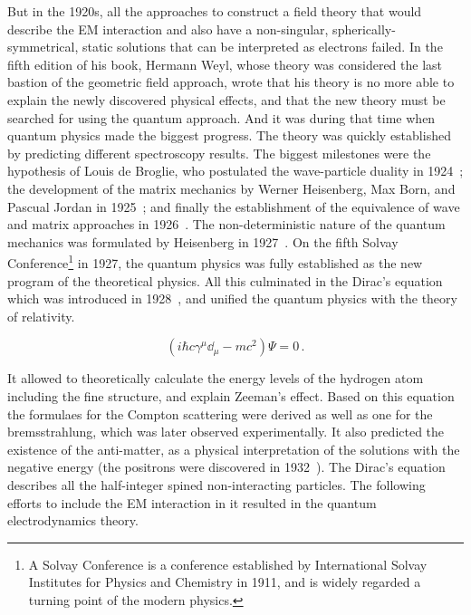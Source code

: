 But in the 1920s, all the approaches to construct a field theory that would describe the EM interaction and also have a non-singular, spherically-symmetrical, static solutions that can be interpreted as electrons failed. In the fifth edition of his book, Hermann Weyl, whose theory was considered the last bastion of the geometric field approach, wrote that his theory is  no more able to explain the newly discovered physical effects, and that the new theory must be searched for using the quantum approach. And it was during that time when quantum physics made the biggest progress. The theory was quickly established by predicting different spectroscopy results. The biggest milestones were the hypothesis of Louis de Broglie, who postulated the wave-particle duality in 1924~\cite{lib:theory_debroglie}; the development of the matrix mechanics by Werner Heisenberg, Max Born, and Pascual Jordan in 1925~\cite{lib:theory_quant1, lib:theory_quant2, lib:theory_quant3}; and finally the establishment of the equivalence of wave and matrix approaches in 1926~\cite{lib:theory_quant4}. The non-deterministic nature of the quantum mechanics was formulated by Heisenberg in 1927~\cite{lib:theory_quant5}. On the fifth Solvay Conference\footnote{A Solvay Conference is a conference established by International Solvay Institutes for Physics and Chemistry in 1911, and is widely regarded a turning point of the modern physics.} in 1927, the quantum physics was fully established as the new program of the theoretical physics. All this culminated in the Dirac's equation which was introduced in 1928~\cite{lib:theory_dirac}, and unified the quantum physics with the theory of relativity.

\begin{equation}
(i \hbar c \gamma^{\mu} \dd_{\mu} - m c^{2})\Psi = 0\,.
\end{equation}

It allowed to theoretically calculate the energy levels of the hydrogen atom including the fine structure, and explain Zeeman's effect. Based on this equation the formulaes for the Compton scattering were derived as well as one for the bremsstrahlung, which was later observed experimentally. It also predicted the existence of the anti-matter, as a physical interpretation of the solutions with the negative energy (the positrons were discovered in 1932~\cite{lib:theory_positron}). The Dirac's equation describes all the half-integer spined non-interacting particles. The following efforts to include the EM interaction in it resulted in the quantum electrodynamics theory.

